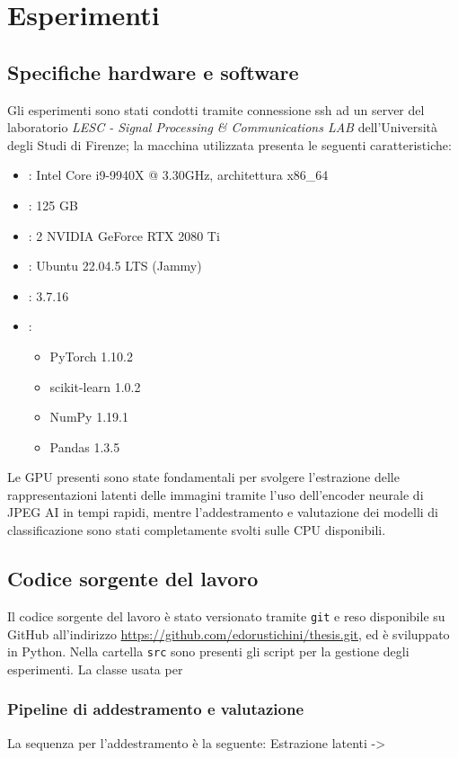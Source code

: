 \chapter{Esperimenti}\label{ch:exp}
\section{Specifiche hardware e software}
Gli esperimenti sono stati condotti tramite connessione ssh ad un server del laboratorio \textit{LESC - Signal Processing \& Communications LAB} dell'Università degli Studi di Firenze; la macchina utilizzata presenta le seguenti caratteristiche:
\begin{itemize}
    \item {}: Intel Core i9-9940X @ 3.30GHz, architettura x86\_64
    \item {}: 125 GB
    \item {}: 2 NVIDIA GeForce RTX 2080 Ti
    \item {}: Ubuntu 22.04.5 LTS (Jammy)
    \item {}: 3.7.16
    \item {}:
    \begin{itemize}
        \item PyTorch 1.10.2
        \item scikit-learn 1.0.2  
        \item NumPy 1.19.1
        \item Pandas 1.3.5
    \end{itemize}
\end{itemize}
Le GPU presenti sono state fondamentali per svolgere l'estrazione delle rappresentazioni latenti delle immagini tramite l'uso dell'encoder neurale di JPEG AI in tempi rapidi, mentre l'addestramento e valutazione dei modelli di classificazione sono stati completamente svolti sulle CPU disponibili.
\section{Codice sorgente del lavoro}
Il codice sorgente del lavoro è stato versionato tramite \texttt{git} e reso disponibile su GitHub all'indirizzo \url{https://github.com/edorustichini/thesis.git}, ed è sviluppato in Python. Nella cartella \texttt{src} sono presenti gli script per la gestione degli esperimenti. La classe usata per 
\subsection{Pipeline di addestramento e valutazione}
La sequenza per l'addestramento è la seguente:
Estrazione latenti ->
